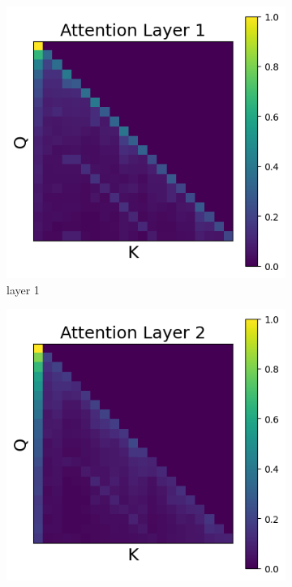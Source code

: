 \documentclass[11pt]{article}
\begin{document}
\subsection{}\label{app:no_intervention}
\begin{figure}[t]
  \begin{subfigure}[t]{0.24\textwidth}
    \centering
    \includegraphics[width=1.4\columnwidth]{figures/no_intervention/layer_1.png}
    \caption{layer 1}
  \end{subfigure}\hfill
  \begin{subfigure}[t]{0.24\textwidth}
    \centering
    \includegraphics[width=1.4\columnwidth]{figures/no_intervention/layer_2.png}

\end{subfigure}
\end{figure}
\end{document}
